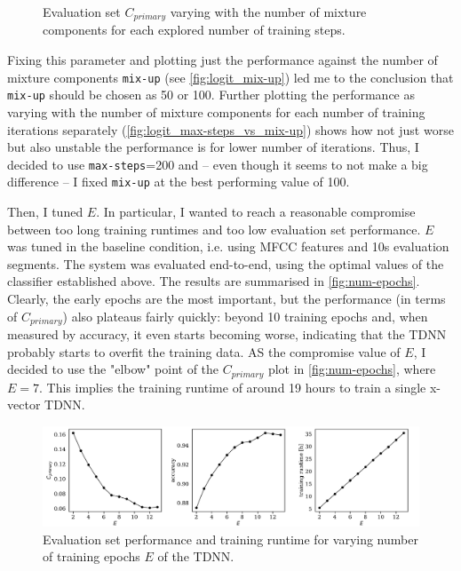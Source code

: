 \documentclass[bsc,frontabs,twoside,singlespacing,parskip,deptreport]{infthesis}
\begin{document}
{{\begin{figure}[h!t]
      \caption{Evaluation set $C_{primary}$ varying with the number of mixture components for each explored number of training steps.}
      \label{fig:logit_max-steps_vs_mix-up}
    \end{figure}
    Fixing this parameter and plotting just the performance against the number of mixture components \verb|mix-up| (see \autoref{fig:logit_mix-up}) led me to the conclusion that \verb|mix-up| should be chosen as 50 or 100. Further plotting the performance as varying with the number of mixture components for each number of training iterations separately (\autoref{fig:logit_max-steps_vs_mix-up}) shows how not just worse but also unstable the performance is for lower number of iterations. Thus, I decided to use \verb|max-steps|=200 and -- even though it seems to not make a big difference -- I fixed \verb|mix-up| at the best performing value of 100.

    Then, I tuned $E$. In particular, I wanted to reach a reasonable compromise between too long training runtimes and too low evaluation set performance. $E$ was tuned in the baseline condition, i.e. using MFCC features and 10s evaluation segments. The system was evaluated end-to-end, using the optimal values of the classifier established above. The results are summarised in \autoref{fig:num-epochs}. Clearly, the early epochs are the most important, but the performance (in terms of $C_{primary}$) also plateaus fairly quickly: beyond 10 training epochs and, when measured by accuracy, it even starts becoming worse, indicating that the TDNN probably starts to overfit the training data. AS the compromise value of $E$, I decided to use the "elbow" point of the $C_{primary}$ plot in \autoref{fig:num-epochs}, where $E=7$. This implies the training runtime of around 19 hours to train a single x-vector TDNN.
    \begin{figure}[h!t]
      \centering
      \includegraphics[width=14.9cm]{../img/num-epochs.pdf}
      \vspace*{-1em}
      \caption{Evaluation set performance and training runtime for varying number of training epochs $E$ of the TDNN.}
      \label{fig:num-epochs}
    \end{figure}
  }
}
\end{document}
